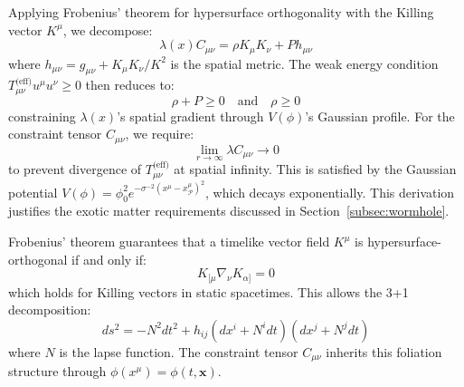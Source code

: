 \documentclass[twocolumn]{article}
\newcommand{\fpit}{\mathcal{P}}
\newcommand{\lagrange}{\lambda(x)}
\begin{document}
	Applying Frobenius' theorem for hypersurface orthogonality with the Killing vector \(K^\mu\)\cite{Wald1984}, we decompose:
	\begin{equation}
		\lagrange C_{\mu\nu} = \rho K_\mu K_\nu + P h_{\mu\nu}
	\end{equation}
	where \(h_{\mu\nu} = g_{\mu\nu} + K_\mu K_\nu/K^2\) is the spatial metric. The weak energy condition \(T_{\mu\nu}^{\text{(eff)}} u^\mu u^\nu \geq 0\) then reduces to:
	\begin{equation}
		\rho + P \geq 0 \quad \text{and} \quad \rho \geq 0
	\end{equation}
	constraining \(\lagrange\)'s spatial gradient through \(V(\phi)\)'s Gaussian profile. For the constraint tensor $C_{\mu\nu}$, we require:
	\begin{equation}
		\lim_{r \to \infty} \lambda C_{\mu\nu} \to 0
	\end{equation}
	to prevent divergence of $T_{\mu\nu}^{\text{(eff)}}$ at spatial infinity. This is satisfied by the Gaussian potential $V(\phi) = \phi_0^2 e^{-\sigma^{-2}(x^\mu - x^\mu_\fpit)^2}$, which decays exponentially. This derivation justifies the exotic matter requirements discussed in Section~\ref{subsec:wormhole}.
	
	Frobenius' theorem\cite{Hawking-Ellis} guarantees that a timelike vector field $K^\mu$ is hypersurface-orthogonal if and only if:
	\begin{equation}
		K_{[\mu}\nabla_\nu K_{\alpha]} = 0
	\end{equation}
	which holds for Killing vectors in static spacetimes. This allows the 3+1 decomposition:
	\begin{equation}
		ds^2 = -N^2 dt^2 + h_{ij}(dx^i + N^i dt)(dx^j + N^j dt)
	\end{equation}
	where $N$ is the lapse function. The constraint tensor $C_{\mu\nu}$ inherits this foliation structure through $\phi(x^\mu) = \phi(t,\mathbf{x})$.
	
\end{document}
